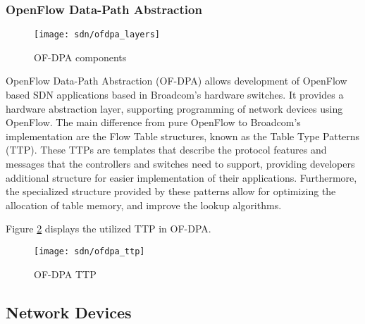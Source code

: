 \begin {enumerate}
\subsubsection{OpenFlow Data-Path Abstraction} \label{sec:ofdpa}

\begin{figure}[H]
    \centering
    \texttt{[image: sdn/ofdpa\_layers]}
    \caption{OF-DPA components \cite{broadcom_corporation_openflow_2017}}
    \label{fig:ofdpa_struct}
\end{figure}

OpenFlow Data-Path Abstraction (OF-DPA) allows development of OpenFlow based SDN applications based in Broadcom's hardware switches. It provides a hardware 
abstraction layer, supporting programming of network devices using OpenFlow. The main difference from pure OpenFlow to Broadcom's implementation are the Flow
Table structures, known as the Table Type Patterns (TTP). These TTPs are templates that describe the protocol features and messages that the controllers and switches
need to support, providing developers additional structure for easier implementation of their applications. Furthermore, the specialized structure provided by these
patterns allow for optimizing the allocation of table memory, and improve the lookup algorithms.

\par Figure \ref{fig:ofdpa_tables} displays the utilized TTP in OF-DPA.

\begin{figure}[H]
    \centering
    \texttt{[image: sdn/ofdpa\_ttp]}
    \caption{OF-DPA TTP \cite{broadcom_corporation_openflow_2017}}
    \label{fig:ofdpa_tables}
\end{figure}

\subsection {Network Devices}


\end{enumerate}
